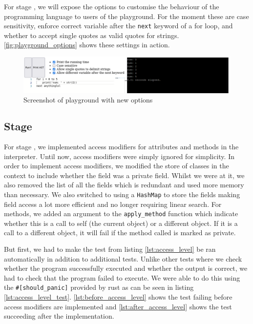 \documentclass{article}
\newcommand{\subsecnum}{\the\value{subsection}}
\begin{document}
For stage \subsecnum, we will expose the options to customise the behaviour of
the programming language to users of the playground. For the moment these are
case sensitivity, enforce correct variable after the \texttt{next} keyword of a
for loop, and whether to accept single quotes as valid quotes for strings.
\autoref{fig:playground_options} shows these settings in action.

\begin{figure}
	\includegraphics[width=\textwidth]{playground_options}
	\caption{Screenshot of playground with new options}
	\label{fig:playground_options}
\end{figure}

\subsection{Stage \subsecnum}

For stage \subsecnum, we implemented access modifiers for attributes and
methods in the interpreter. Until now, access modifiers were simply ignored for
simplicity. In order to implement access modifiers, we modified the store of
classes in the context to include whether the field was a private field. Whilst
we were at it, we also removed the list of all the fields which is redundant
and used more memory than necessary. We also switched to using a
\texttt{HashMap} to store the fields making field access a lot more efficient
and no longer requiring linear search. For methods, we added an argument to the
\texttt{apply\_method} function which indicate whether this is a call to self
(the current object) or a different object. If it is a call to a different
object, it will fail if the method called is marked as private.

But first, we had to make the test from listing \ref{lst:access_level} be ran
automatically in addition to additional tests. Unlike other tests where we
check whether the program successfully executed and whether the output is
correct, we had to check that the program failed to execute. We were able to do
this using the \texttt{#[should_panic]} provided by rust as can be
seen in listing \ref{lst:access_level_test}. \autoref{lst:before_access_level}
shows the test failing before access modifiers are implemented and
\autoref{lst:after_access_level} shows the test succeeding after the
implementation.
\end{document}
